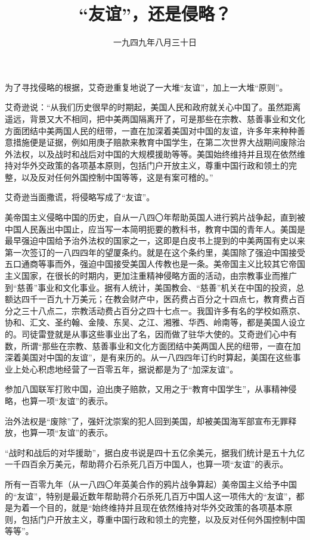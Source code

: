 
\title{“友谊”，还是侵略？}
\date{一九四九年八月三十日}
\maketitle


为了寻找侵略的根据，艾奇逊重复地说了一大堆“友谊”，加上一大堆“原则”。

艾奇逊说：“从我们历史很早的时期起，美国人民和政府就关心中国了。虽然距离遥远，背景又大不相同，把中美两国隔离开了，可是那些在宗教、慈善事业和文化方面团结中美两国人民的纽带，一直在加深着美国对中国的友谊，许多年来种种善意措施便是证据，例如用庚子赔款来教育中国学生，在第二次世界大战期间废除治外法权，以及战时和战后对中国的大规模援助等等。美国始终维持并且现在依然维持对华外交政策的各项基本原则，包括门户开放主义，尊重中国行政和领土的完整，以及反对任何外国控制中国等等，这是有案可稽的。”

艾奇逊当面撒谎，将侵略写成了“友谊”。

美帝国主义侵略中国的历史，自从一八四〇年帮助英国人进行鸦片战争起，直到被中国人民轰出中国止，应当写一本简明扼要的教科书，教育中国的青年人。美国是最早强迫中国给予治外法权的国家之一，这即是白皮书上提到的中美两国有史以来第一次签订的一八四四年的望厦条约。就是在这个条约里，美国除了强迫中国接受五口通商等事而外，强迫中国接受美国人传教也是一条。美帝国主义比较其它帝国主义国家，在很长的时期内，更加注重精神侵略方面的活动，由宗教事业而推广到“慈善”事业和文化事业。据有人统计，美国教会、“慈善”机关在中国的投资，总额达四千一百九十万美元；在教会财产中，医药费占百分之十四点七，教育费占百分之三十八点二，宗教活动费占百分之四十七点一。我国许多有名的学校如燕京、协和、汇文、圣约翰、金陵、东吴、之江、湘雅、华西、岭南等，都是美国人设立的。司徒雷登就是从事这些事业出了名，因而做了驻华大使的。艾奇逊们心中有数，所谓“那些在宗教、慈善事业和文化方面团结中美两国人民的纽带，一直在加深着美国对中国的友谊”，是有来历的。从一八四四年订约时算起，美国在这些事业上处心积虑地经营了一百零五年，据说都是为了“加深友谊”。

参加八国联军打败中国，迫出庚子赔款，又用之于“教育中国学生”，从事精神侵略，也算一项“友谊”的表示。

治外法权是“废除”了，强奸沈崇案的犯人回到美国，却被美国海军部宣布无罪释放，也算一项“友谊”的表示。

“战时和战后的对华援助”，据白皮书说是四十五亿余美元，据我们统计是五十九亿一千四百余万美元，帮助蒋介石杀死几百万中国人，也算一项“友谊”的表示。

所有一百零九年（从一八四〇年英美合作的鸦片战争算起）美帝国主义给予中国的“友谊”，特别是最近数年帮助蒋介石杀死几百万中国人这一项伟大的“友谊”，都是为着一个目的，就是“始终维持并且现在依然维持对华外交政策的各项基本原则，包括门户开放主义，尊重中国行政和领土的完整，以及反对任何外国控制中国等等”。

